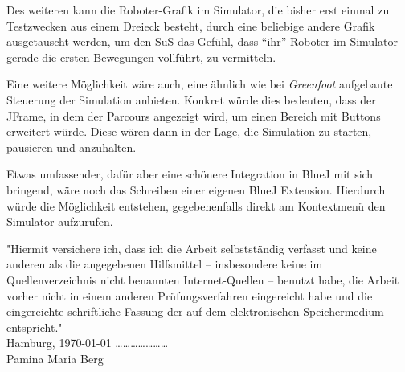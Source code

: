 \documentclass[paper=a4, pagesize, DIV=calc, BCOR=15mm, twoside=on, onecolumn=on, open = right, titlepage =on, parskip =half-, headsepline = on, footsepline = on, chapterprefix = on, appendixprefix = off, fontsize = 12pt, numbers = noenddot, abstract = on]{scrbook}
\numberwithin{equation}{chapter}
\theoremstyle{definition}
\theoremstyle{plain}
\theoremstyle{plain}
\theoremstyle{remark}
\theoremstyle{plain}
\theoremstyle{plain}
\begin{document}
Des weiteren kann die Roboter-Grafik im Simulator, die bisher erst einmal zu Testzwecken aus einem Dreieck besteht, durch eine beliebige andere Grafik ausgetauscht werden, um den SuS das Gefühl, dass "`ihr"' Roboter im Simulator gerade die ersten Bewegungen vollführt, zu vermitteln.

Eine weitere Möglichkeit wäre auch, eine ähnlich wie bei \emph{Greenfoot} aufgebaute Steuerung der Simulation anbieten. Konkret würde dies bedeuten, dass der JFrame, in dem der Parcours angezeigt wird, um einen Bereich mit Buttons erweitert würde. Diese wären dann in der Lage, die Simulation zu starten, pausieren und anzuhalten.

Etwas umfassender, dafür aber eine schönere Integration in BlueJ mit sich bringend, wäre noch das Schreiben einer eigenen BlueJ Extension. Hierdurch würde die Möglichkeit entstehen, gegebenenfalls direkt am Kontextmenü den Simulator aufzurufen.

\newpage

\newpage
\thispagestyle{empty}
\vspace*{\fill}
"Hiermit versichere ich, dass ich die Arbeit selbstständig verfasst und keine anderen als die angegebenen Hilfsmittel – insbesondere keine im Quellenverzeichnis nicht benannten Internet-Quellen – benutzt habe, die Arbeit vorher nicht in einem anderen Prüfungsverfahren eingereicht habe und die eingereichte schriftliche Fassung der auf dem elektronischen Speichermedium entspricht."\\

Hamburg, \today \hspace*{\fill} \dots \dots \dots \dots \dots \dots \dots\\
\hspace*{\fill} Pamina Maria Berg $\,$
\end{document}
